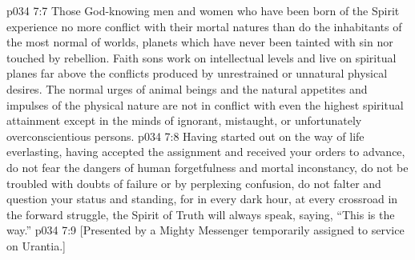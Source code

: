\vs p034 7:7 Those God\hyp{}knowing men and women who have been born of the Spirit experience no more conflict with their mortal natures than do the inhabitants of the most normal of worlds, planets which have never been tainted with sin nor touched by rebellion. Faith sons work on intellectual levels and live on spiritual planes far above the conflicts produced by unrestrained or unnatural physical desires. The normal urges of animal beings and the natural appetites and impulses of the physical nature are not in conflict with even the highest spiritual attainment except in the minds of ignorant, mistaught, or unfortunately overconscientious persons.
\vs p034 7:8 \pc Having started out on the way of life everlasting, having accepted the assignment and received your orders to advance, do not fear the dangers of human forgetfulness and mortal inconstancy, do not be troubled with doubts of failure or by perplexing confusion, do not falter and question your status and standing, for in every dark hour, at every crossroad in the forward struggle, the Spirit of Truth will always speak, saying, “This is the way.”
\vsetoff
\vs p034 7:9 [Presented by a Mighty Messenger temporarily assigned to service on Urantia.]
